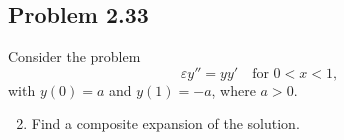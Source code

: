 \documentclass[11pt]{amsart}
\begin{document}
\subsection*{Problem 2.33}
Consider the problem
\[
\varepsilon y'' = y y' \quad \text{for } 0 < x < 1,
\]
with $y(0) = a$ and $y(1) = -a$, where $a > 0$.
\begin{enumerate}[label=(\alph*)]
  \setcounter{enumi}{1}
  \item Find a composite expansion of the solution.
\end{enumerate}
\end{document}

